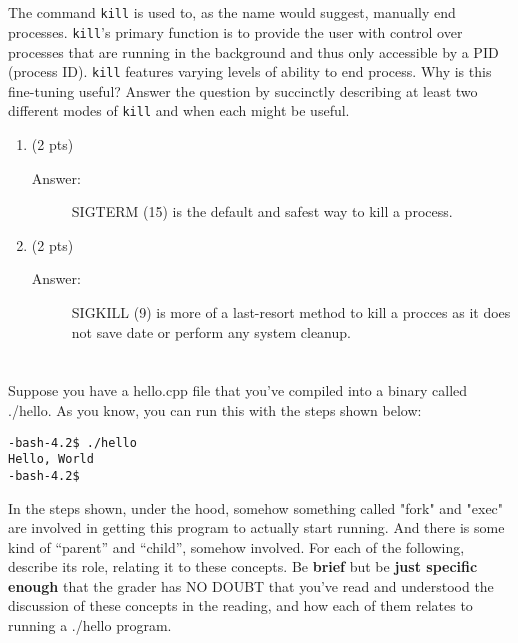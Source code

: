 \documentclass[11pt]{article}
\begin{document}
\section{}
\label{sec:orgd387d2e}

The command \texttt{kill} is used to, as the name would suggest, manually end
processes. \texttt{kill}'s primary function is to provide the user with control
over processes that are running in the background and thus only
accessible by a PID (process ID). \texttt{kill} features varying levels of
ability to end process. Why is this fine-tuning useful? Answer the
question by succinctly describing at least two different modes of \texttt{kill}
and when each might be useful.

\begin{enumerate}
\item (2 pts)

\begin{description}
    \item[Answer:] SIGTERM (15) is the default and safest way to kill a process.
\end{description}

\item (2 pts)

\begin{description}
    \item[Answer:] SIGKILL (9) is more of a last-resort method to kill a procces as it does not save date or perform any system cleanup.
\end{description}

\end{enumerate}

\section{}
\label{sec:org6d48ef7}


Suppose you have a hello.cpp file that you've compiled into a binary
called ./hello. As you know, you can run this with the steps shown
below:

\begin{verbatim}
-bash-4.2$ ./hello
Hello, World
-bash-4.2$
\end{verbatim}

In the steps shown, under the hood, somehow something called "fork"
and "exec" are involved in getting this program to actually start
running. And there is some kind of “parent” and “child”, somehow
involved. For each of the following, describe its role, relating it to
these concepts. Be \textbf{brief} but be \textbf{just specific enough} that the grader
has NO DOUBT that you've read and understood the discussion of these
concepts in the reading, and how each of them relates to running a
./hello program.
\end{document}
